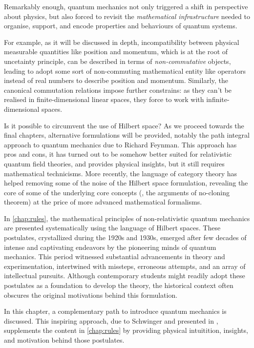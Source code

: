 \begin{refsection}
  Remarkably enough, quantum mechanics not only triggered a shift in perspective about physics, but also forced to revisit the \emph{mathematical infrastructure} needed to organise, support, and encode properties and behaviours of quantum systems.


For example, as it will be discussed in depth, incompatibility between physical measurable quantities like position and
momentum, which is at the root of uncetainty principle, can be described in
terms of \emph{non-commutative} objects, leading to adopt some sort of non-commuting mathematical entity like 
operators instead of real numbers to describe position and momentum.
Similarly, 
  the canonical commutation relations impose further
constrains: as they can't be realised in finite-dimensional linear spaces,
  they force to work with infinite-dimensional spaces. 

Is it possible to circumvent the use of Hilbert space?
As we proceed towards the final chapters,
  alternative formulations will be provided, notably
  the path integral approach to quantum mechanics due to Richard Feynman. This approach has pros and cons, it has turned out to be somehow better suited for relativistic quantum field theories, and provides physical insights, but it still requires mathematical technicisms. More recently, the language of category theory has helped removing some of the noise of the Hilbert space formulation, revealing the core of some of the underlying core concepts (\eg, the arguments of no-cloning theorem) at the price of more advanced mathematical formalisms.

  In \cref{chap:rules}, the mathematical principles of non-relativistic quantum mechanics are presented systematically using the language of Hilbert spaces. These postulates, crystallized during the 1920s and 1930s, emerged after few decades of intense and captivating endeavors by the pioneering minds of quantum mechanics. This period witnessed substantial advancements in theory and experimentation, intertwined with missteps, erroneous attempts, and an array of intellectual pursuits. Although contemporary students might readily adopt these postulates as a foundation to develop the theory, the historical context often obscures the original motivations behind this formulation.

  In this chapter, a complementary path to introduce quantum mechanics is discussed.
This inspiring approach, due to Schwinger and presented in \textcite{Schwinger:2001}, 
supplements  the content in \cref{chap:rules} by providing physical intuitition, insights, and motivation behind those postulates.


\end{refsection}

